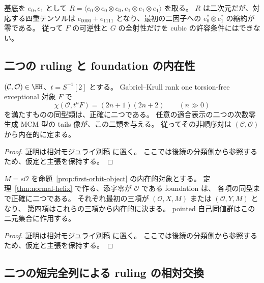 \begin{example}
基底を $e_0,e_1$ として
$R=\langle e_0\otimes e_0\otimes e_0,
          e_1\otimes e_1\otimes e_1\rangle$ を取る。
$R$ は二次元だが、対応する四重テンソルは
$e_{0000}+e_{1111}$ となり、最初の二因子への
$e_0^*\otimes e_1^*$ の縮約が零である。
従って $F$ の可逆性と $G$ の全射性だけを cubic の許容条件にはできない。
\end{example}

\subsection{二つの ruling と foundation の内在性}

\begin{proposition}
\label{prop:intrinsic-ruling-pair}
$(\mathcal C,\mathcal O)\in\HH$、$t=S^{-1}[2]$ とする。
Gabriel--Krull rank one torsion-free exceptional 対象 $F$ で
\[
 \chi(\mathcal O,t^nF)=(2n+1)(2n+2)\qquad(n\gg0)
\]
を満たすものの同型類は、正確に二つである。
任意の適合表示の二つの次数零生成 MCM 型の tails 像が、この二類を与える。
従ってその非順序対は $(\mathcal C,\mathcal O)$ から内在的に定まる。
\end{proposition}

\begin{proof}
証明は相対モジュライ別稿 \cite[\texttt{foundation_stack} 節]{QuadricModuli2026} に置く。
ここでは後続の分類側から参照するため、仮定と主張を保持する。
\end{proof}

\begin{corollary}
\label{cor:two-intrinsic-foundations}
$M=s\mathcal O$ を命題~\ref{prop:first-orbit-object} の内在的対象とする。
定理~\ref{thm:normal-helix} で作る、添字零が $\mathcal O$ である foundation は、
各項の同型まで正確に二つである。
それぞれ最初の三項が $(\mathcal O,X,M)$ または $(\mathcal O,Y,M)$ となり、
第四項はこれらの三項から内在的に決まる。
pointed 自己同値群はこの二元集合に作用する。
\end{corollary}

\begin{proof}
証明は相対モジュライ別稿 \cite[\texttt{foundation_stack} 節]{QuadricModuli2026} に置く。
ここでは後続の分類側から参照するため、仮定と主張を保持する。
\end{proof}

\subsection{二つの短完全列による ruling の相対交換}
\label{subsec:foundation-ruling-involution}

